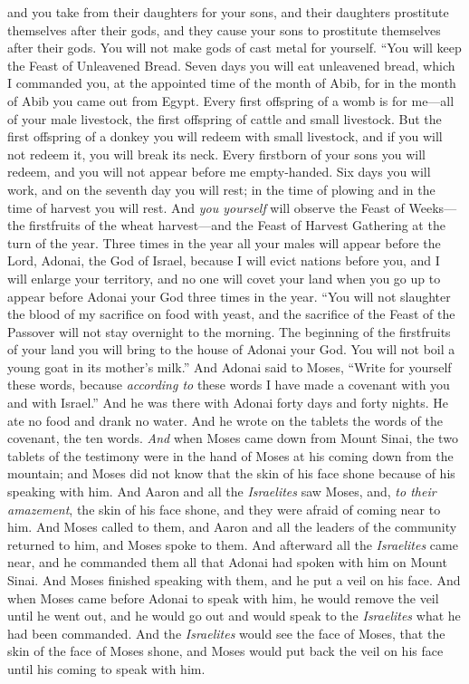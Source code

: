 \begin{biblechapter}
\verse and you take from their daughters for your sons, and their daughters prostitute themselves after their gods, and they cause your sons to prostitute themselves after their gods.
\verse You will not make gods of cast metal for yourself.
\verse “You will keep the Feast of Unleavened Bread. Seven days you will eat unleavened bread, which I commanded you, at the appointed time of the month of Abib, for in the month of Abib you came out from Egypt.
\verse Every first offspring of a womb is for me—all of your male livestock, the first offspring of cattle and small livestock.
\verse But the first offspring of a donkey you will redeem with small livestock, and if you will not redeem it, you will break its neck. Every firstborn of your sons you will redeem, and you will not appear before me empty-handed.
\verse Six days you will work, and on the seventh day you will rest; in the time of plowing and in the time of harvest you will rest.
\verse And \textit{you yourself} will observe the Feast of Weeks—the firstfruits of the wheat harvest—and the Feast of Harvest Gathering at the turn of the year.
\verse Three times in the year all your males will appear before the Lord, Adonai, the God of Israel,
\verse because I will evict nations before you, and I will enlarge your territory, and no one will covet your land when you go up to appear before Adonai your God three times in the year.
\verse “You will not slaughter the blood of my sacrifice on food with yeast, and the sacrifice of the Feast of the Passover will not stay overnight to the morning.
\verse The beginning of the firstfruits of your land you will bring to the house of Adonai your God. You will not boil a young goat in its mother’s milk.”
\verse And Adonai said to Moses, “Write for yourself these words, because \textit{according to} these words I have made a covenant with you and with Israel.”
 And he was there with Adonai forty days and forty nights. He ate no food and drank no water. And he wrote on the tablets the words of the covenant, the ten words.
\verse \textit{And} when Moses came down from Mount Sinai, the two tablets of the testimony were in the hand of Moses at his coming down from the mountain; and Moses did not know that the skin of his face shone because of his speaking with him.
\verse And Aaron and all the \textit{Israelites} saw Moses, and, \textit{to their amazement}, the skin of his face shone, and they were afraid of coming near to him.
\verse And Moses called to them, and Aaron and all the leaders of the community returned to him, and Moses spoke to them.
\verse And afterward all the \textit{Israelites} came near, and he commanded them all that Adonai had spoken with him on Mount Sinai.
\verse And Moses finished speaking with them, and he put a veil on his face.
\verse And when Moses came before Adonai to speak with him, he would remove the veil until he went out, and he would go out and would speak to the \textit{Israelites} what he had been commanded.
\verse And the \textit{Israelites} would see the face of Moses, that the skin of the face of Moses shone, and Moses would put back the veil on his face until his coming to speak with him.
\end{biblechapter}

